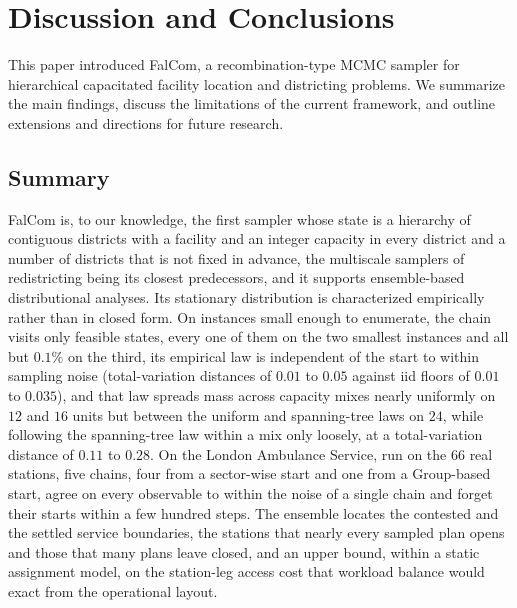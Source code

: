 \documentclass[preprint,12pt,authoryear]{elsarticle}
\theoremstyle{definition}
\begin{document}
\FloatBarrier

\section{Discussion and Conclusions}
\label{sec:discussion}

This paper introduced FalCom, a recombination-type MCMC sampler for hierarchical capacitated facility location and districting problems. We summarize the main findings, discuss the limitations of the current framework, and outline extensions and directions for future research.

\subsection{Summary}

FalCom is, to our knowledge, the first sampler whose state is a hierarchy of contiguous districts with a facility and an integer capacity in every district and a number of districts that is not fixed in advance, the multiscale samplers of redistricting being its closest predecessors, and it supports ensemble-based distributional analyses. Its stationary distribution is characterized empirically rather than in closed form. On instances small enough to enumerate, the chain visits only feasible states, every one of them on the two smallest instances and all but $0.1\%$ on the third, its empirical law is independent of the start to within sampling noise (total-variation distances of $0.01$ to $0.05$ against iid floors of $0.01$ to $0.035$), and that law spreads mass across capacity mixes nearly uniformly on $12$ and $16$ units but between the uniform and spanning-tree laws on $24$, while following the spanning-tree law within a mix only loosely, at a total-variation distance of $0.11$ to $0.28$. On the London Ambulance Service, run on the $66$ real stations, five chains, four from a sector-wise start and one from a Group-based start, agree on every observable to within the noise of a single chain and forget their starts within a few hundred steps. The ensemble locates the contested and the settled service boundaries, the stations that nearly every sampled plan opens and those that many plans leave closed, and an upper bound, within a static assignment model, on the station-leg access cost that workload balance would exact from the operational layout.
\end{document}
